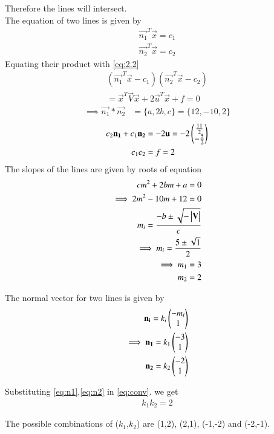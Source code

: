 \documentclass[journal,12pt,twocolumn]{IEEEtran}
\begin{document}
\noindent
Therefore the lines will intersect.\\
The equation of two lines is given by
\begin{align}
    \vec{n_1}^T\vec{x}=c_1\label{eq:2.22}\\
    \vec{n_2}^T\vec{x}=c_2\label{eq:2.23}
\end{align}
Equating their product with \eqref{eq:2.2}
\begin{multline}
    (\vec{n_1}^T\vec{x}-c_1)(\vec{n_2}^T\vec{x}-c_2)\\=\vec{x}^T\vec{V}\vec{x}+2\vec{u}^T\vec{x}+f=0
\end{multline}
\begin{align}
    \implies\vec{n_1}*\vec{n_2}&=\{a,2b,c\}=\{12,-10,2\}\label{eq:conv}
\end{align}
\begin{align}
    c_2\mathbf{n_1}+c_1\mathbf{n_2}&=-2\mathbf{u}=-2\begin{pmatrix}\frac{11}{2} \\ -\frac{5}{2}\end{pmatrix}\label{eq:2.26}\\
    c_1c_2&=f=2
\end{align}
The slopes of the lines are given by roots of equation
\begin{align}
    cm^2+2bm+a=0\label{eq:poly}\\
    \implies 2m^2-10m+12=0\\
    m_i=\frac{-b\pm{\sqrt{-\ensuremath{\begin{vmatrix}\mathbf{V}\end{vmatrix}}}}}{c}\\
    \implies m_i=\frac{5\pm{\sqrt{1}}}{2}\\
    \implies m_1=3\\
     m_2=2
\end{align}

The normal vector for two lines is given by
\begin{align}
    \mathbf{n_i}=k_i\begin{pmatrix}-m_i\\1\end{pmatrix}\label{eq:normvec}\\
    \implies\mathbf{n_1}=k_1\begin{pmatrix}-3\\1\end{pmatrix}\label{eq:n1}\\
    \mathbf{n_2}=k_2\begin{pmatrix}-2\\1\end{pmatrix}\label{eq:n2}
\end{align}

Substituting \eqref{eq:n1},\eqref{eq:n2} in \eqref{eq:conv}. we get
\begin{align}
    k_1k_2=2
\end{align}

The possible combinations of ($k_1$,$k_2$) are (1,2), (2,1), (-1,-2) and (-2,-1).
\end{document}
